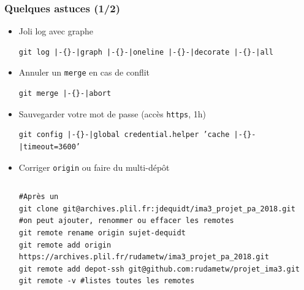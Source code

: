 \documentclass[table,tikz,12pt,svgnames]{beamer}
\begin{document}
\begin{frame}[fragile]
\frametitle{Quelques astuces (1/2)}
\vspace{-1em}
\begin{block}{}
\begin{itemize}
\item Joli log avec graphe
\begin{adjustwidth}{0em}{0cm}
\begin{verbatim}
git log |-{}-|graph |-{}-|oneline |-{}-|decorate |-{}-|all
\end{verbatim}
\end{adjustwidth}
\item Annuler un \texttt{merge} en cas de conflit
\begin{adjustwidth}{0em}{0cm}
\begin{verbatim}
git merge |-{}-|abort
\end{verbatim}
\end{adjustwidth}
\item Sauvegarder votre mot de passe (accès \texttt{https}, 1h)
\begin{adjustwidth}{-3em}{0cm}
\begin{verbatim}
git config |-{}-|global credential.helper ’cache |-{}-|timeout=3600’
\end{verbatim}
\end{adjustwidth}
\item Corriger \texttt{origin} ou faire du multi-dépôt
\begin{adjustwidth}{-3.9em}{0cm}
\begin{columns}
\column{\dimexpr\linewidth+24pt}
\begin{verbatim}
#Après un
git clone git@archives.plil.fr:jdequidt/ima3_projet_pa_2018.git
#on peut ajouter, renommer ou effacer les remotes
git remote rename origin sujet-dequidt
git remote add origin https://archives.plil.fr/rudametw/ima3_projet_pa_2018.git
git remote add depot-ssh git@github.com:rudametw/projet_ima3.git
git remote -v #listes toutes les remotes
\end{verbatim}
\end{columns}
\end{adjustwidth}
\end{itemize}
\end{block}
\end{frame}
\end{document}
